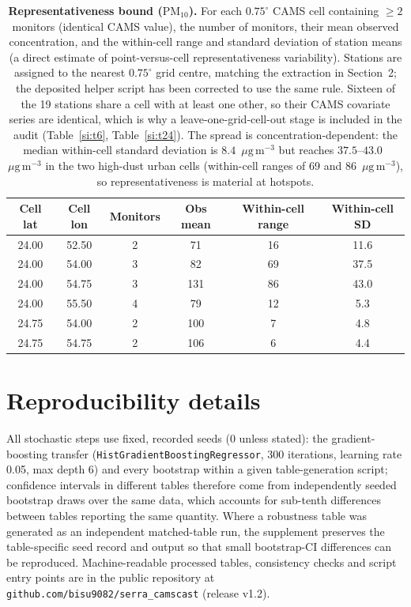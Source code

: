 \documentclass[11pt]{article}
\newcommand*{\ugm}{\ensuremath{\mu\mathrm{g\,m^{-3}}}}
\newcommand*{\pmten}{\ensuremath{\mathrm{PM_{10}}}}
\begin{document}
\begin{table}[htbp]\centering\footnotesize
\caption{\textbf{Representativeness bound (\pmten{}).} For each $0.75^\circ$ CAMS cell containing $\geq2$ monitors (identical CAMS value), the number of monitors, their mean observed concentration, and the within-cell range and standard deviation of station means (a direct estimate of point-versus-cell representativeness variability). Stations are assigned to the nearest $0.75^\circ$ grid centre, matching the extraction in Section~2; the deposited helper script has been corrected to use the same rule. Sixteen of the 19 stations share a cell with at least one other, so their CAMS covariate series are identical, which is why a leave-one-grid-cell-out stage is included in the audit (Table~\ref{si:t6}, Table~\ref{si:t24}). The spread is concentration-dependent: the median within-cell standard deviation is $8.4$~\ugm{} but reaches $37.5$--$43.0$~\ugm{} in the two high-dust urban cells (within-cell ranges of 69 and 86~\ugm), so representativeness is material at hotspots.}
\label{si:t17}
\begin{tabular}{cccccc}\toprule
Cell lat & Cell lon & Monitors & Obs mean & Within-cell range & Within-cell SD \\ \midrule
24.00 & 52.50 & 2 & 71 & 16 & 11.6 \\
24.00 & 54.00 & 3 & 82 & 69 & 37.5 \\
24.00 & 54.75 & 3 & 131 & 86 & 43.0 \\
24.00 & 55.50 & 4 & 79 & 12 & 5.3 \\
24.75 & 54.00 & 2 & 100 & 7 & 4.8 \\
24.75 & 54.75 & 2 & 106 & 6 & 4.4 \\
\bottomrule\end{tabular}\end{table}



\section{Reproducibility details}
All stochastic steps use fixed, recorded seeds (0 unless stated): the gradient-boosting transfer (\texttt{HistGradientBoostingRegressor}, 300 iterations, learning rate 0.05, max depth 6) and every bootstrap within a given table-generation script; confidence intervals in different tables therefore come from independently seeded bootstrap draws over the same data, which accounts for sub-tenth differences between tables reporting the same quantity. Where a robustness table was generated as an independent matched-table run, the supplement preserves the table-specific seed record and output so that small bootstrap-CI differences can be reproduced. Machine-readable processed tables, consistency checks and script entry points are in the public repository at \texttt{github.com/bisu9082/serra\_camscast} (release v1.2).
\end{document}
